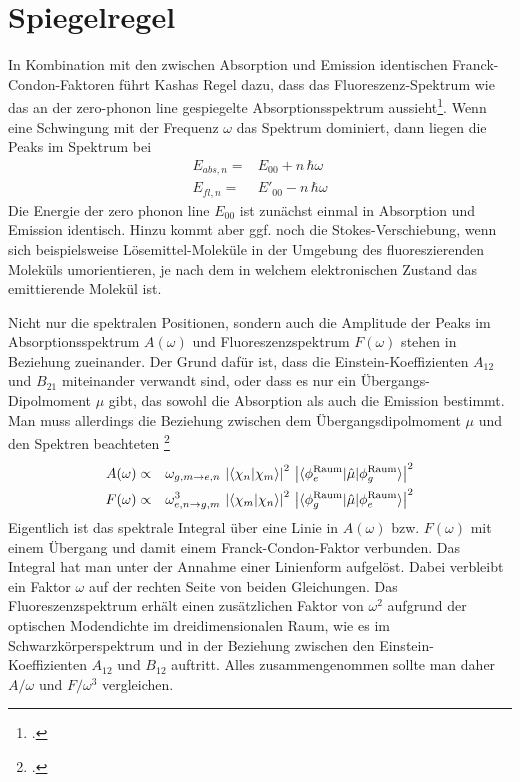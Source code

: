 \section{Spiegelregel}

In Kombination mit den zwischen Absorption und Emission identischen Franck-Condon-Faktoren führt  Kashas Regel dazu, dass das Fluoreszenz-Spektrum wie das an der zero-phonon line gespiegelte Absorptionsspektrum aussieht\footcite[Kapitel 1.3.2 und 1.3.3]{Lakowicz2010}. Wenn eine Schwingung mit der Frequenz $\omega$ das Spektrum dominiert, dann liegen die Peaks im Spektrum bei
\begin{align}
  E_{abs, n} = & E_{00} + n \, \hbar \omega \\
  E_{fl, n} = & E'_{00} - n \, \hbar \omega
\end{align}
Die Energie der zero phonon line $E_{00}$ ist zunächst einmal in Absorption und Emission identisch.  Hinzu kommt aber ggf. noch die Stokes-Verschiebung, wenn sich beispielsweise Lösemittel-Moleküle in der Umgebung des fluoreszierenden Moleküls umorientieren, je nach dem in welchem elektronischen Zustand das emittierende Molekül ist.



Nicht nur die spektralen Positionen, sondern auch die Amplitude der Peaks im Absorptionsspektrum $A(\omega)$ und Fluoreszenzspektrum $F(\omega)$ stehen in Beziehung zueinander. Der Grund dafür ist, dass die Einstein-Koeffizienten $A_{12}$ und $B_{21}$ miteinander verwandt sind, oder dass es nur ein Übergangs-Dipolmoment $\mu$ gibt, das sowohl die Absorption als auch die Emission bestimmt. Man muss allerdings die Beziehung zwischen dem Übergangsdipolmoment $\mu$ und den Spektren beachteten \footcite[Kapitel 5.2]{Parson}
\begin{eqnarray}
   A(\omega  )  & \propto & \omega_{g,m \rightarrow e,n}  \,  \left| \braket{\chi_n |  \chi_m} \right|^2 
\,  \left| \braket{\phi^\text{Raum}_e | \hat{\mu} | \phi^\text{Raum}_g} \right|^2 \\
   F(\omega ) & \propto & \omega_{e,n \rightarrow g,m}^3 \,  \left| \braket{\chi_m |  \chi_n} \right|^2 
\,  \left|\braket{\phi^\text{Raum}_g | \hat{\mu} | \phi^\text{Raum}_e} \right|^2
\end{eqnarray}
Eigentlich ist das spektrale Integral über eine Linie in $A(\omega  )$ bzw. $F(\omega)$ mit einem Übergang und damit einem Franck-Condon-Faktor verbunden. Das Integral hat man unter der Annahme einer Linienform aufgelöst. Dabei verbleibt ein Faktor $\omega$ auf der rechten Seite von beiden Gleichungen. Das Fluoreszenzspektrum erhält einen zusätzlichen Faktor von $\omega^2$ aufgrund der optischen Modendichte im dreidimensionalen Raum, wie es im Schwarzkörperspektrum und in der  Beziehung zwischen den Einstein-Koeffizienten $A_{12}$ und $B_{12}$ auftritt.
Alles zusammengenommen sollte man daher $A / \omega$ und $F / \omega^3$ vergleichen.



